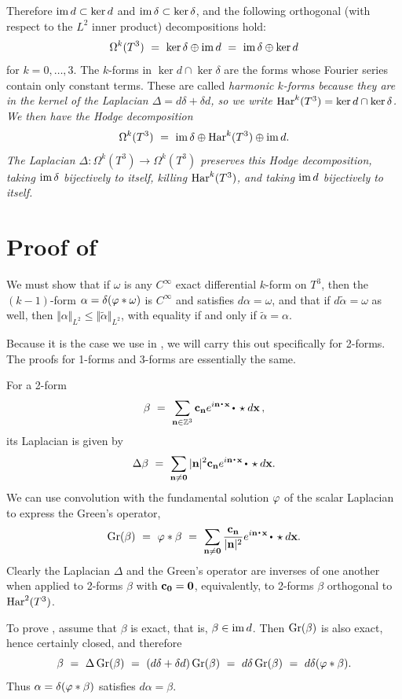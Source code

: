 Therefore $\mathrm{im\,} d\subset\ker d$ and $\mathrm{im\,} \delta\subset\ker\delta$, and
the following orthogonal (with respect to the $L^2$ inner product) decompositions hold:
$$
\Omega^k(T^3)\ = \ \ker\delta\oplus\im d \ = \ \im\delta\oplus\ker d
$$
for $k=0,\ldots,3$. The $k$-forms in $\ker d\cap\ker\delta$ are the forms
whose Fourier series contain only constant terms. These are called \it harmonic \rm
$k$-forms because they are in the kernel of
the Laplacian $\Delta=d\delta+\delta d$, so we write $\mathop{\rm Har}\nolimits^k(T^3)=\ker d\cap\ker\delta$.
We then have the Hodge decomposition 
$$
\Omega^k(T^3)\ = \ \im\delta\oplus\Har^k(T^3)\oplus \im d.
$$
The Laplacian $\Delta\colon\Omega^k(T^3)\to\Omega^k(T^3)$ preserves this Hodge decomposition, 
taking $\mathrm{im\,} \delta$ bijectively to itself, killing $\mathop{\rm Har}\nolimits^k(T^3)$, and taking $\mathrm{im\,} d$ bijectively to itself.

\part{Proof of }

We must show that if $\omega$ is any $C^\infty$ exact differential $k$-form on $T^3$, then the $(k-1)$-form $\alpha=\delta(\varphi*\omega)$ is $C^\infty$ and satisfies
$d\alpha=\omega$, and that if $d\widetilde\alpha=\omega$ as well, then $\Vert\alpha\Vert_{L^2}
\le\Vert\widetilde\alpha\Vert_{L^2}$, with equality if and only if $\widetilde\alpha=\alpha$.

Because it is the case we use in , we will carry this out 
specifically for 2-forms. The proofs for 1-forms and 3-forms
are essentially the same. 

For a 2-form 
$$
\beta\ = \ \sum_{\n\in\ints^3}\c_\n e^{i\n\dte\x}\dt \star d\x\,,
$$ 
its Laplacian is given by
$$
\Delta\beta\ = \ \sum_{\n\ne\zero}|\n|^2\c_\n e^{i\n\dte\x}\dt \star d\x.
$$
We can use convolution with the fundamental solution $\varphi$ of the scalar Laplacian to express the Green's operator,
$$
\Gr(\beta)\ = \ \ph * \beta \ = \  \sum_{\n\ne \zero}{\c_\n\over|\n|^2}e^{i\n\dte\x}\dt \star d\x.
$$
Clearly the Laplacian $\Delta$ and the Green's operator are inverses of one another when applied to 2-forms $\beta$ with $\textup{\bf c}_{\bf0}={\bf0}$, equivalently, to 2-forms $\beta$ orthogonal to $\mathop{\rm Har}\nolimits^2(T^3)$.

To prove , assume that $\beta$ is exact, that is, 
$\beta\in\mathrm{im\,} d$. Then $\mathop{\rm Gr}\nolimits(\beta)$ is also exact, hence certainly closed, and therefore
$$
\beta\ = \ \Delta\Gr(\beta)\ = \ (d\delta+\delta d)\Gr(\beta)\ = \ d\delta\Gr(\beta)\ = \ d\delta(\ph*\beta).
$$
Thus $\alpha=\delta(\varphi*\beta)$ satisfies $d\alpha=\beta$.

